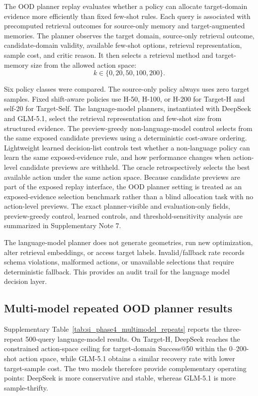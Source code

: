 \documentclass[final,1p,times]{elsarticle}
\begin{document}
The OOD planner replay evaluates whether a policy can allocate target-domain evidence more efficiently than fixed few-shot rules. Each query is associated with precomputed retrieval outcomes for source-only memory and target-augmented memories. The planner observes the target domain, source-only retrieval outcome, candidate-domain validity, available few-shot options, retrieval representation, sample cost, and critic reason. It then selects a retrieval method and target-memory size from the allowed action space:
\[
k \in \{0,20,50,100,200\}.
\]

Six policy classes were compared. The source-only policy always uses zero target samples. Fixed shift-aware policies use H-50, H-100, or H-200 for Target-H and self-20 for Target-Self. The language-model planners, instantiated with DeepSeek and GLM-5.1, select the retrieval representation and few-shot size from structured evidence. The preview-greedy non-language-model control selects from the same exposed candidate previews using a deterministic cost-aware ordering. Lightweight learned decision-list controls test whether a non-language policy can learn the same exposed-evidence rule, and how performance changes when action-level candidate previews are withheld. The oracle retrospectively selects the best available action under the same action space. Because candidate previews are part of the exposed replay interface, the OOD planner setting is treated as an exposed-evidence selection benchmark rather than a blind allocation task with no action-level previews. The exact planner-visible and evaluation-only fields, preview-greedy control, learned controls, and threshold-sensitivity analysis are summarized in Supplementary Note 7.

The language-model planner does not generate geometries, run new optimization, alter retrieval embeddings, or access target labels. Invalid/fallback rate records schema violations, malformed actions, or unavailable selections that require deterministic fallback. This provides an audit trail for the language model decision layer.

\subsection{Multi-model repeated OOD planner results}

Supplementary Table~\ref{tab:si_phase4_multimodel_repeats} reports the three-repeat 500-query language-model results. On Target-H, DeepSeek reaches the constrained action-space ceiling for target-domain Success@50 within the 0--200-shot action space, while GLM-5.1 obtains a similar recovery rate with lower target-sample cost. The two models therefore provide complementary operating points: DeepSeek is more conservative and stable, whereas GLM-5.1 is more sample-thrifty.
\end{document}
